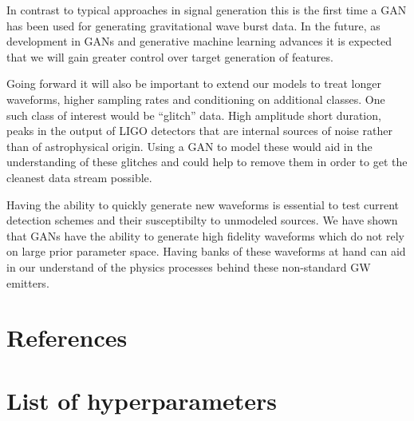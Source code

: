 \documentclass[12pt]{iopart}
\begin{document}
In contrast to typical approaches in signal generation this is the first time a \ac{GAN} has been used for generating gravitational wave burst data. In the future, as development in \acp{GAN} and generative machine learning advances it is expected that we will gain greater control over target generation of features. 

Going forward it will also be important to extend our models to treat longer waveforms, higher sampling rates and conditioning on additional classes. One such class of interest would be ``glitch'' data. High amplitude short duration, peaks in the output of LIGO detectors that are internal sources of noise rather than of astrophysical origin. Using a \ac{GAN} to model these would aid in the understanding of these glitches and could help to remove them in order to get the cleanest data stream possible. 

Having the ability to quickly
generate new waveforms is essential to test current detection schemes and their
susceptibilty to unmodeled sources. We have shown that \acp{GAN} have the ability
to generate high fidelity waveforms which do not rely on large prior parameter space. Having banks of these
waveforms at hand can aid in our understand of the physics processes behind
these non-standard \ac{GW} emitters.  

\clearpage

\section*{References}


\clearpage

\appendix
\section{List of hyperparameters}
\end{document}
